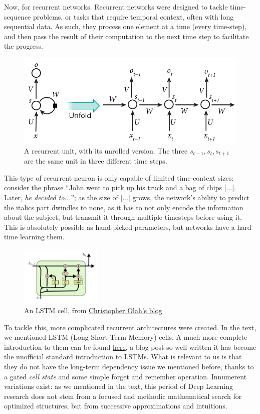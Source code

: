 \documentclass[../main.tex]{subfiles}
\begin{document}
Now, for recurrent networks. Recurrent networks were designed to tackle time-sequence problems, or tasks that require temporal context, often with long sequential data. As such, they process one element at a time (every time-step), and then pass the result of their computation to the next time step to facilitate the progress.
\begin{figure}[h]
    \caption{A recurrent unit, with its unrolled version. The three $s_{t-1}, s_t, s_{t+1}$ are the same unit in three different time steps\cite{lecunDeepLearning2015}. }
    \includegraphics[width=\textwidth]{img/RNN.png}
\end{figure}
This type of recurrent neuron is only capable of limited time-context sizes: consider the phrase ``John went to pick up his truck and a bag of chips [...]. Later, \textit{he decided to...}''; as the size of [...] grows, the network's ability to predict the italics part dwindles to none, as it has to not only encode the information about the subject, but transmit it through multiple timesteps before using it. This is absolutely possible as hand-picked parameters, but networks have a hard time learning them.
\vspace{4pt}
\begin{figure}
    \centering
    \caption{An LSTM cell, from \href{http://colah.github.io/posts/2015-08-Understanding-LSTMs/}{Christopher Olah's blog} }
    \includegraphics[width=0.35\textwidth]{img/LSTM.png}
\end{figure}

To tackle this, more complicated recurrent architectures were created. In the text, we mentioned LSTM (Long Short-Term Memory) cells. A much more complete introduction to them can be found \href{http://colah.github.io/posts/2015-08-Understanding-LSTMs/}{here}, a blog post so well-written it has become the unofficial standard introduction to LSTMs. What is relevant to us is that they do not have the long-term dependency issue we mentioned before, thanks to a gated \textit{cell state} and some simple forget and remember operation. Innumerent variations exist: as we mentioned in the text, this period of Deep Learning research does not stem from a focused and methodic mathematical search for optimized structures, but from successive approximations and intuitions.
\end{document}
